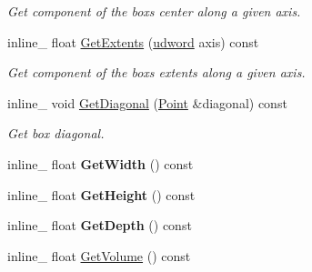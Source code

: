 \begin{DoxyCompactItemize}
\begin{DoxyCompactList}\small\item\em Get component of the box\textquotesingle{}s center along a given axis. \end{DoxyCompactList}\item 
inline\+\_\+ float \hyperlink{classAABB_aea26078bba53d349784874129f57c43a}{Get\+Extents} (\hyperlink{IceTypes_8h_a44c6f1920ba5551225fb534f9d1a1733}{udword} axis) const \hypertarget{classAABB_aea26078bba53d349784874129f57c43a}{}\label{classAABB_aea26078bba53d349784874129f57c43a}

\begin{DoxyCompactList}\small\item\em Get component of the box\textquotesingle{}s extents along a given axis. \end{DoxyCompactList}\item 
inline\+\_\+ void \hyperlink{classAABB_a6d67e251acd758927015377cf984b5f8}{Get\+Diagonal} (\hyperlink{classPoint}{Point} \&diagonal) const \hypertarget{classAABB_a6d67e251acd758927015377cf984b5f8}{}\label{classAABB_a6d67e251acd758927015377cf984b5f8}

\begin{DoxyCompactList}\small\item\em Get box diagonal. \end{DoxyCompactList}\item 
inline\+\_\+ float {\bfseries Get\+Width} () const \hypertarget{classAABB_ad7e334a58884b34d931593627b80f439}{}\label{classAABB_ad7e334a58884b34d931593627b80f439}

\item 
inline\+\_\+ float {\bfseries Get\+Height} () const \hypertarget{classAABB_a94ec6a1ad6ccdb538be061ea6c63c664}{}\label{classAABB_a94ec6a1ad6ccdb538be061ea6c63c664}

\item 
inline\+\_\+ float {\bfseries Get\+Depth} () const \hypertarget{classAABB_a3ad1814f5600a0a73bcb36148c9afb20}{}\label{classAABB_a3ad1814f5600a0a73bcb36148c9afb20}

\item 
inline\+\_\+ float \hyperlink{classAABB_a2c888a7387ffd8fbc4144f5d63892be6}{Get\+Volume} () const \hypertarget{classAABB_a2c888a7387ffd8fbc4144f5d63892be6}{}\label{classAABB_a2c888a7387ffd8fbc4144f5d63892be6}


\end{DoxyCompactItemize}
